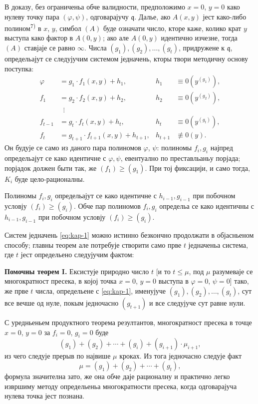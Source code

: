 \documentclass[11pt]{article}
\theoremstyle{plain}
\begin{document}
В доказу, без ограниченьа обче валидности, предположимо $x = 0$,
$y = 0$ како нулеву точку пара $(\varphi, \psi)$, одговарајучу
$\mathfrak{q}$. Далье, ако $A(x,y)$ јест како-либо полином\textsuperscript{7)}
в $x$, $y$, симбол $(A)$ буде означати число, кторе каже, колико
крат $y$ выступа како фактор в $A(0,y)$; ако але $A(0,y)$
идентично изчезне, тогда $(A)$ ставјаје се равно $\infty$. Числа
$(g_{1}), (g_{2}), \ldots, (g_{t})$, придружене к $\mathfrak{q}$,
определьајут се следујучим системом једначень, кторы твори
методичну основу поступка:
\begin{equation}\label{eq:kap-1}
\begin{aligned}
\varphi &= g_{1} \cdot f_{1}(x,y) + h_{1}, & h_{1} &\equiv 0(y^{(g_{1})}),\\
f_{1} &= g_{2} \cdot f_{2}(x,y) + h_{2}, & h_{2} &\equiv 0(y^{(g_{2})}),\\
&\;\;\vdots &&\\
f_{t-1} &= g_{t} \cdot f_{t}(x,y) + h_{t}, & h_{t} &\equiv 0(y^{(g_{t})}),\\
f_{t} &= g_{t+1} \cdot f_{t+1}(x,y) + h_{t+1}, & h_{t+1} &\not\equiv 0(y).
\end{aligned}
\end{equation}
Он будује се само из даного пара полиномов $\varphi$, $\psi$:
полиномы $f_{i}, g_{i}$ најпред определьајут се како идентичне с
$\varphi, \psi$, евентуално по преставльаньу порјада; порјадок
должен быти так, же $(f_{1}) \geq (g_{1})$. При тој фиксацији, и
само тогда, $K_{i}$ буде цело-рационалны.

Полиномы $f_{i}, g_{i}$ определьајут се како идентичне с
$h_{i-1}, g_{i-1}$ при побочном условју $(f_{i}) \geq (g_{i})$.
Обче пар полиномов $f_{i}, g_{i}$ определьа се како идентичны с
$h_{i-1}, g_{i-1}$ при побочном условју $(f_{i}) \geq (g_{i})$.

Систем једначень \eqref{eq:kap-1} можно истинно безкончно
продолжати в објасньеном способу; главны теорем але потребује
створити само прве $t$ једначеньа система, где $t$ јест определьено
следујучим фактом:

\smallskip
\textbf{Помочны теорем I.} Ексистује природно число $t$ [и то
$t \leq \mu$, под $\mu$ разумеваје се многократност пресека, в којој
точка $x = 0$, $y = 0$ выступа в $\varphi = 0$, $\psi = 0$] тако, же
прве $t$ числа, определьене с \eqref{eq:kap-1}, именујуче
$(g_{1}), (g_{2}), \ldots, (g_{t})$, сут все вечше од нуле, покым
једночасно $(g_{t+1})$ и все следујуче сут равне нули.

С уредньеньем продуктного теорема резултантов, многократност
пресека в точце $x = 0$, $y = 0$ за $f_{i} = 0$, $g_{i} = 0$ буде
\[
(g_{1}) + (g_{2}) + \cdots + (g_{i}) + (g_{i+1}) \cdot \mu_{i+1},
\]
из чего следује прерыв по највише $\mu$ кроках. Из тога једночасно
следује факт
\begin{equation}\label{eq:kap-2}
\mu = (g_{1}) + (g_{2}) + \cdots + (g_{t}),
\end{equation}
формула значителна зато, же она обче даје рационалну и практично
легко извршиму методу определьеньа многократности пресека, когда
одговарајуча нулева точка јест познана.
\end{document}
